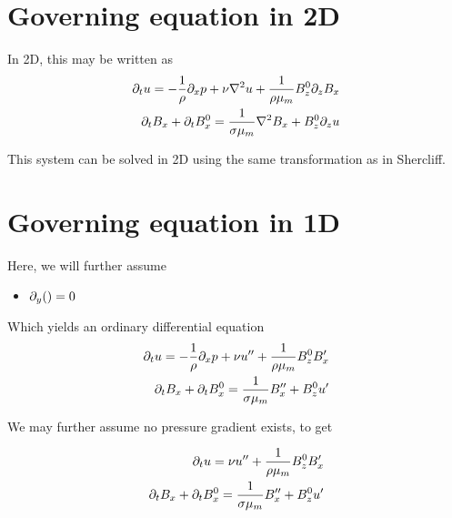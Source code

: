 \documentclass[11pt]{article}
\begin{document}
\section{Governing equation in 2D}
In 2D, this may be written as
\begin{equation}\begin{aligned}
\partial_t u                 = -\frac{1}{\rho}\partial_x p+ \nu \nabla^2 u + \frac{1}{\rho {\mu_m}} B_z^0 \partial_z B_x \\
\partial_t B_x + \partial_t B_x^0 = \frac{1}{\sigma {\mu_m}} \nabla^2 B_x + B_z^0 \partial_z u \\
\end{aligned} \end{equation}

This system can be solved in 2D using the same transformation as in Shercliff.

\section{Governing equation in 1D}
Here, we will further assume
\begin{itemize}\setlength\itemsep{-1em}
	\item $\partial_y () = 0$
\end{itemize}
Which yields an ordinary differential equation
\begin{equation}\begin{aligned}
\partial_t u                 = -\frac{1}{\rho}\partial_x p+ \nu u'' + \frac{1}{\rho {\mu_m}} B_z^0 B_x' \\
\partial_t B_x + \partial_t B_x^0 = \frac{1}{\sigma {\mu_m}} B_x'' + B_z^0 u' \\
\end{aligned} \end{equation}

We may further assume no pressure gradient exists, to get

\begin{equation}\begin{aligned}
\partial_t u                 = \nu u'' + \frac{1}{\rho {\mu_m}} B_z^0 B_x' \\
\partial_t B_x + \partial_t B_x^0 = \frac{1}{\sigma {\mu_m}} B_x'' + B_z^0 u' \\
\end{aligned} \end{equation}
\end{document}
